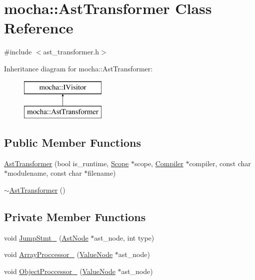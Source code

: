 \hypertarget{classmocha_1_1_ast_transformer}{
\section{mocha::AstTransformer Class Reference}
\label{classmocha_1_1_ast_transformer}
}


{\ttfamily \#include $<$ast\_\-transformer.h$>$}

Inheritance diagram for mocha::AstTransformer:\begin{figure}[H]
\begin{center}
\leavevmode
\includegraphics[height=2.000000cm]{classmocha_1_1_ast_transformer}
\end{center}
\end{figure}
\subsection*{Public Member Functions}
\begin{DoxyCompactItemize}
\item 
\hyperlink{classmocha_1_1_ast_transformer_a339e9862f527dae139b581fe5c044d75}{AstTransformer} (bool is\_\-runtime, \hyperlink{classmocha_1_1_scope}{Scope} $\ast$scope, \hyperlink{classmocha_1_1_compiler}{Compiler} $\ast$compiler, const char $\ast$modulename, const char $\ast$filename)
\begin{DoxyCompactList}\small\item\em \end{DoxyCompactList}\item 
\hyperlink{classmocha_1_1_ast_transformer_a6214cb90fe29f044738d475a57316fc1}{$\sim$AstTransformer} ()
\end{DoxyCompactItemize}
\subsection*{Private Member Functions}
\begin{DoxyCompactItemize}
\item 
void \hyperlink{classmocha_1_1_ast_transformer_a68ad2536f5387586ceeeb0dfb514e0b5}{JumpStmt\_\-} (\hyperlink{classmocha_1_1_ast_node}{AstNode} $\ast$ast\_\-node, int type)
\item 
void \hyperlink{classmocha_1_1_ast_transformer_a0e449e3bd337b0b2d86a868ad30cd3c4}{ArrayProccessor\_\-} (\hyperlink{classmocha_1_1_value_node}{ValueNode} $\ast$ast\_\-node)
\item 
void \hyperlink{classmocha_1_1_ast_transformer_a9c212582c300f321a26186b206ad1181}{ObjectProccessor\_\-} (\hyperlink{classmocha_1_1_value_node}{ValueNode} $\ast$ast\_\-node)
\end{DoxyCompactItemize}
